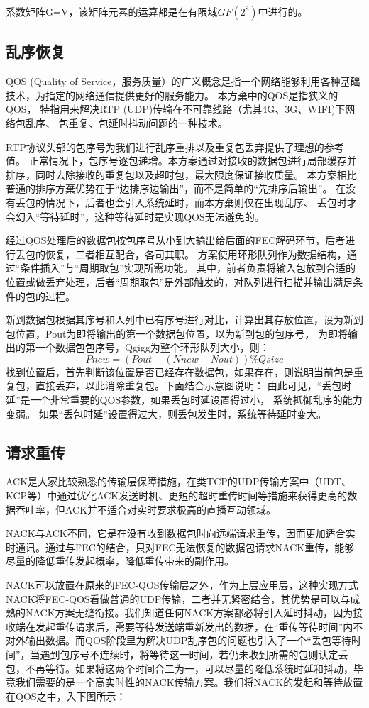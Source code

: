 \documentclass[onecolumn]{article}
\begin{document}
\begin{CJK*}{UTF8}{gbsn}
系数矩阵G=V，该矩阵元素的运算都是在有限域$GF(2^8)$中进行的。

\subsection{乱序恢复}
QOS (Quality of Service，服务质量）的广义概念是指一个网络能够利用各种基础技术，为指定的网络通信提供更好的服务能力。
本方棄中的QOS是指狭义的QOS， 特指用来解决RTP (UDP)传输在不可靠线路（尤其4G、3G、WIFI)下网络包乱序、 包重复、包延时抖动问题的一种技术。

RTP协议头部的包序号为我们进行乱序重排以及重复包丢弃提供了理想的参考值。
正常情况下，包序号逐包递增。本方案通过对接收的数据包进行局部缓存并排序，同时去除接收的重复包以及超时包，最大限度保证接收质量。
本方案相比普通的排序方棄优势在于“边排序边输出”，而不是简单的“先排序后输出”。
在没有丢包的情况下，后者也会引入系统延时，而本方棄则仅在出现乱序、 丢包时才会幻入“等待延时”，这种等待延时是实现QOS无法避免的。

经过QOS处理后的数据包按包序号从小到大输出给后面的FEC解码环节，后者进行丢包的恢复，二者相互配合，各司其职。
方案使用环形队列作为数据结构，通过“条件插入”与“周期取包”实现所需功能。 其中，前者负责将输入包放到合适的位置或做丢弃处理，后者“周期取包”是外部触发的，对队列进行扫描并输出满足条件的包的过程。

新到数据包根据其序号和人列中已有序号进行对比，计算出其存放位置，设为新到包位置，Pout为即将输出的第一个数据包位置，以为新到包的包序号， 为即将输出的第一个数据包包序号，Qgigg为整个环形队列大小，则：
$$Pnew = (Pout + (Nnew - Nout))\%Qsize$$
找到位置后，首先判断该位置是否已经存在数据包，如果存在，则说明当前包是重复包，直接丢弃，以此消除重复包。下面结合示意图说明：
由此可见，“丢包时延”是一个非常重要的QOS参数，如果丢包时延设置得过小， 系统抵御乱序的能力变弱。
如果“丢包时延”设置得过大，则丢包发生时，系统等待延时变大。

\subsection{请求重传}
ACK是大家比较熟悉的传输层保障措施，在类TCP的UDP传输方案中（UDT、KCP等）中通过优化ACK发送时机、更短的超时重传时间等措施来获得更高的数据吞吐率，但ACK并不适合对实时要求极高的直播互动领域。

NACK与ACK不同，它是在没有收到数据包时向远端请求重传，因而更加适合实时通讯。通过与FEC的结合，只对FEC无法恢复的数据包请求NACK重传，能够尽量的降低重传发起概率，降低重传带来的副作用。

NACK可以放置在原来的FEC-QOS传输层之外，作为上层应用层，这种实现方式NACK将FEC-QOS看做普通的UDP传输，二者并无紧密结合，其优势是可以与成熟的NACK方案无缝衔接。我们知道任何NACK方案都必将引入延时抖动，因为接收端在发起重传请求后，需要等待发送端重新发出的数据，在“重传等待时间”内不对外输出数据。而QOS阶段里为解决UDP乱序包的问题也引入了一个“丢包等待时间”，当遇到包序号不连续时，将等待这一时间，若仍未收到所需的包则认定丢包，不再等待。如果将这两个时间合二为一，可以尽量的降低系统时延和抖动，毕竟我们需要的是一个高实时性的NACK传输方案。我们将NACK的发起和等待放置在QOS之中，入下图所示：


\end{CJK*}
\end{document}
